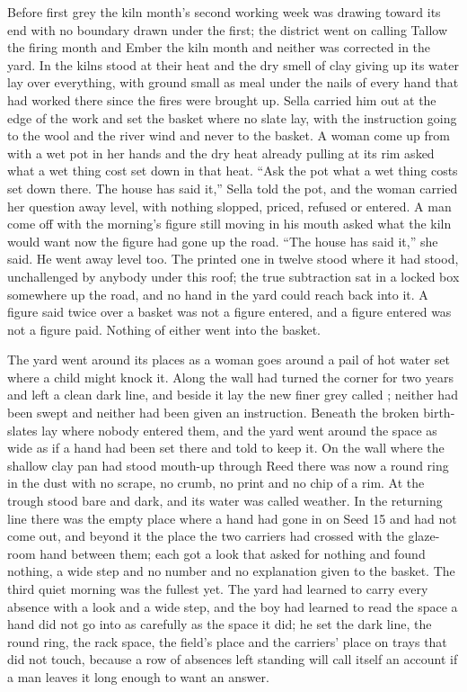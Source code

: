 Before first grey the kiln month's second working week was drawing toward its end with no boundary drawn under the first; the district went on calling Tallow the firing month and Ember the kiln month and neither was corrected in the yard. In  the kilns stood at their heat and the dry smell of clay giving up its water lay over everything, with  ground small as meal under the nails of every hand that had worked there since the fires were brought up. Sella carried him out at the edge of the work and set the basket where no slate lay, with the instruction going to the wool and the river wind and never to the basket. A woman come up from  with a wet pot in her hands and the dry heat already pulling at its rim asked what a wet thing cost set down in that heat. “Ask the pot what a wet thing costs set down there. The house has said it,” Sella told the pot, and the woman carried her question away level, with nothing slopped, priced, refused or entered. A man come off  with the morning's figure still moving in his mouth asked what the kiln would want now the figure had gone up the road. “The house has said it,” she said. He went away level too. The printed one in twelve stood where it had stood, unchallenged by anybody under this roof; the true subtraction sat in a locked box somewhere up the road, and no hand in the yard could reach back into it. A figure said twice over a basket was not a figure entered, and a figure entered was not a figure paid. Nothing of either went into the basket.

The yard went around its places as a woman goes around a pail of hot water set where a child might knock it. Along the wall  had turned the corner for two years and left a clean dark line, and beside it lay the new finer grey called ; neither had been swept and neither had been given an instruction. Beneath  the broken birth-slates lay where nobody entered them, and the yard went around the space as wide as if a hand had been set there and told to keep it. On the wall where the shallow clay pan had stood mouth-up through Reed there was now a round ring in the dust with no scrape, no crumb, no print and no chip of a rim. At  the trough stood bare and dark, and its water was called weather. In the returning line there was the empty place where a hand had gone in on Seed 15 and had not come out, and beyond it the place the two carriers had crossed with the glaze-room hand between them; each got a look that asked for nothing and found nothing, a wide step and no number and no explanation given to the basket. The third quiet morning was the fullest yet. The yard had learned to carry every absence with a look and a wide step, and the boy had learned to read the space a hand did not go into as carefully as the space it did; he set the dark line, the round ring, the rack space, the field's place and the carriers' place on trays that did not touch, because a row of absences left standing will call itself an account if a man leaves it long enough to want an answer.

